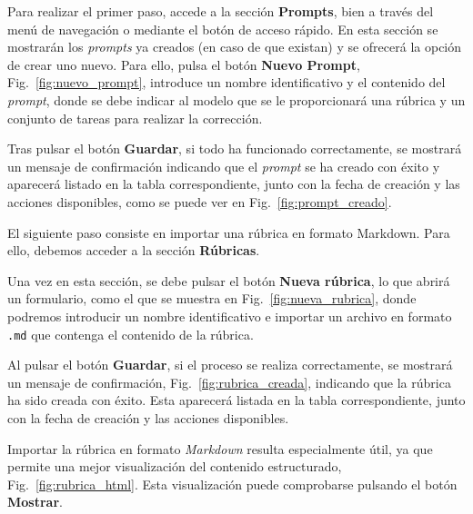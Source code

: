 Para realizar el primer paso, accede a la sección \textbf{Prompts}, bien a través del menú de navegación o mediante el botón de acceso rápido. En esta sección se mostrarán los \textit{prompts} ya creados (en caso de que existan) y se ofrecerá la opción de crear uno nuevo. Para ello, pulsa el botón \textbf{Nuevo Prompt}, Fig.~\ref{fig:nuevo_prompt}, introduce un nombre identificativo y el contenido del \textit{prompt}, donde se debe indicar al modelo que se le proporcionará una rúbrica y un conjunto de tareas para realizar la corrección.


Tras pulsar el botón \textbf{Guardar}, si todo ha funcionado correctamente, se mostrará un mensaje de confirmación indicando que el \textit{prompt} se ha creado con éxito y aparecerá listado en la tabla correspondiente, junto con la fecha de creación y las acciones disponibles, como se puede ver en Fig.~\ref{fig:prompt_creado}.


El siguiente paso consiste en importar una rúbrica en formato Markdown. Para ello, debemos acceder a la sección \textbf{Rúbricas}.

Una vez en esta sección, se debe pulsar el botón \textbf{Nueva rúbrica}, lo que abrirá un formulario, como el que se muestra en Fig.~\ref{fig:nueva_rubrica}, donde podremos introducir un nombre identificativo e importar un archivo en formato \texttt{.md} que contenga el contenido de la rúbrica.


Al pulsar el botón \textbf{Guardar}, si el proceso se realiza correctamente, se mostrará un mensaje de confirmación, Fig.~\ref{fig:rubrica_creada}, indicando que la rúbrica ha sido creada con éxito. Esta aparecerá listada en la tabla correspondiente, junto con la fecha de creación y las acciones disponibles.


Importar la rúbrica en formato \textit{Markdown} resulta especialmente útil, ya que permite una mejor visualización del contenido estructurado, Fig.~\ref{fig:rubrica_html}. Esta visualización puede comprobarse pulsando el botón \textbf{Mostrar}.


